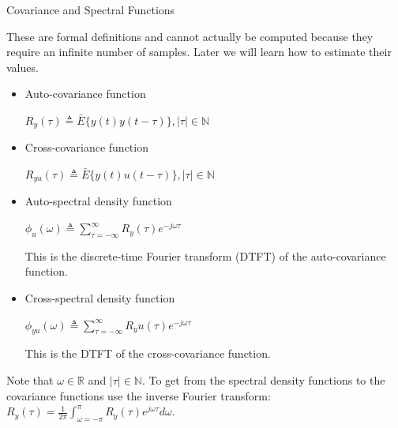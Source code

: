 \documentclass[lecture,12pt,]{pcms-l}
\theoremstyle{example}
\newcommand{\w}{\omega}
\begin{document}
\begin{definition}{Covariance and Spectral Functions}

These are formal definitions and cannot actually be computed because they require an infinite number of samples. Later we will learn how to estimate their values.
\begin{itemize}
\item Auto-covariance function

$R_y(\tau) \triangleq \bar{E}\{y(t)y(t-\tau)\}, |\tau|\in\mathbb{N}$
\item Cross-covariance function

$R_{yu}(\tau) \triangleq \bar{E}\{y(t)u(t-\tau)\}, |\tau|\in\mathbb{N}$
\item Auto-spectral density function

$\phi_u(\w) \triangleq \sum_{\tau=-\infty}^\infty R_y(\tau)e^{-j\w\tau}$

This is the discrete-time Fourier transform (DTFT) of the auto-covariance function.
\item Cross-spectral density function

$\phi_{yu}(\w) \triangleq \sum_{\tau=-\infty}^\infty R_yu(\tau)e^{-j\w\tau}$

This is the DTFT of the cross-covariance function.
\end{itemize}
Note that $\w\in\mathbb{R}$ and $|\tau|\in\mathbb{N}$. To get from the spectral density functions to the covariance functions use the inverse Fourier transform: $R_y(\tau) = \frac{1}{2\pi}\int_{\w=-\pi}^\pi R_y(\tau)e^{j\w\tau}d\w$.
\end{definition}
\end{document}
